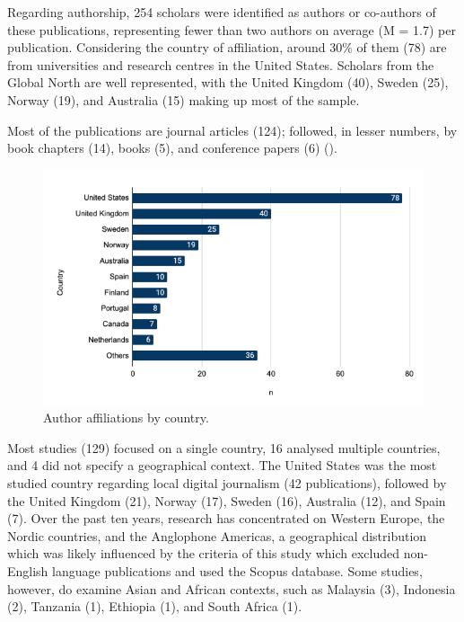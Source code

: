 \documentclass[english]{textolivre}
\begin{document}
Regarding authorship, 254 scholars were identified as authors or co-authors of these publications, representing fewer than two authors on average (M = 1.7) per publication. Considering the country of affiliation, around 30\% of them (78) are from universities and research centres in the United States. Scholars from the Global North are well represented, with the United Kingdom (40), Sweden (25), Norway (19), and Australia (15) making up most of the sample.

Most of the publications are journal articles (124); followed, in lesser numbers, by book chapters (14), books (5), and conference papers (6) ().

\begin{figure}[htbp]
\centering
\begin{minipage}{0.85\textwidth}
\includegraphics[width =\textwidth]{Imagens/Fig3.png}
\caption{Author affiliations by country.}
\label{fig-3}
\end{minipage}
\end{figure}

Most studies (129) focused on a single country, 16 analysed multiple countries, and 4 did not specify a geographical context. The United States was the most studied country regarding local digital journalism (42 publications), followed by the United Kingdom (21), Norway (17), Sweden (16), Australia (12), and Spain (7). Over the past ten years, research has concentrated on Western Europe, the Nordic countries, and the Anglophone Americas, a geographical distribution which was likely influenced by the criteria of this study which excluded non-English language publications and used the Scopus database. Some studies, however, do examine Asian and African contexts, such as Malaysia (3), Indonesia (2), Tanzania (1), Ethiopia (1), and South Africa (1).
\end{document}
